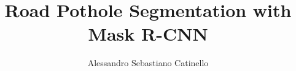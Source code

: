 \documentclass[12pt,a4paper,openany,oneside]{book}
\begin{document}


\title{Road Pothole Segmentation with Mask R-CNN}
\author{Alessandro Sebastiano Catinello}



\tableofcontents






\end{document}
